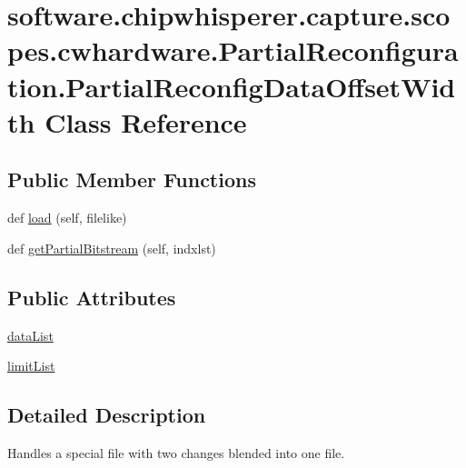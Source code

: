 \hypertarget{classsoftware_1_1chipwhisperer_1_1capture_1_1scopes_1_1cwhardware_1_1PartialReconfiguration_1_1PartialReconfigDataOffsetWidth}{}\section{software.\+chipwhisperer.\+capture.\+scopes.\+cwhardware.\+Partial\+Reconfiguration.\+Partial\+Reconfig\+Data\+Offset\+Width Class Reference}
\label{classsoftware_1_1chipwhisperer_1_1capture_1_1scopes_1_1cwhardware_1_1PartialReconfiguration_1_1PartialReconfigDataOffsetWidth}
\subsection*{Public Member Functions}
\begin{DoxyCompactItemize}
\item 
def \hyperlink{classsoftware_1_1chipwhisperer_1_1capture_1_1scopes_1_1cwhardware_1_1PartialReconfiguration_1_1PartialReconfigDataOffsetWidth_ac10c488fa77f035048bf914b21ad000a}{load} (self, filelike)
\item 
def \hyperlink{classsoftware_1_1chipwhisperer_1_1capture_1_1scopes_1_1cwhardware_1_1PartialReconfiguration_1_1PartialReconfigDataOffsetWidth_a9b281285fbdf7c6a1fbd853bffd43d8e}{get\+Partial\+Bitstream} (self, indxlst)
\end{DoxyCompactItemize}
\subsection*{Public Attributes}
\begin{DoxyCompactItemize}
\item 
\hyperlink{classsoftware_1_1chipwhisperer_1_1capture_1_1scopes_1_1cwhardware_1_1PartialReconfiguration_1_1PartialReconfigDataOffsetWidth_a4b7af01554cac24175693be37e40424b}{data\+List}
\item 
\hyperlink{classsoftware_1_1chipwhisperer_1_1capture_1_1scopes_1_1cwhardware_1_1PartialReconfiguration_1_1PartialReconfigDataOffsetWidth_a00ed8e5b711a259aa28111e34f6da3f7}{limit\+List}
\end{DoxyCompactItemize}


\subsection{Detailed Description}
\begin{DoxyVerb}Handles a special file with two changes blended into one file. \end{DoxyVerb}
 

